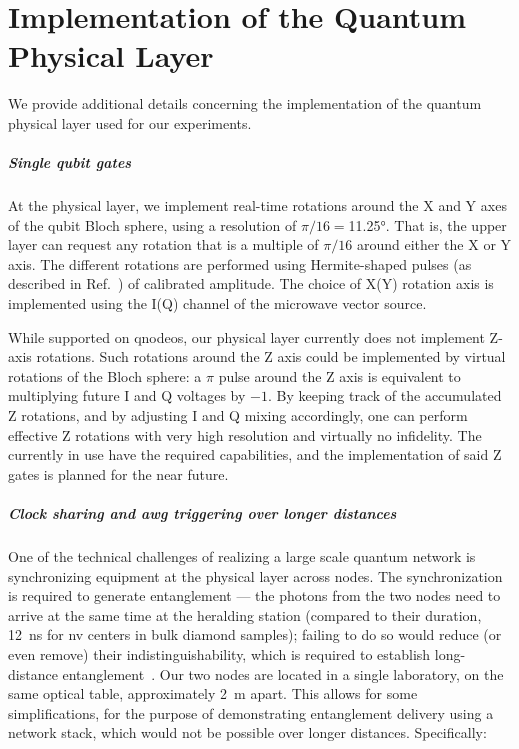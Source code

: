 \chapter{Implementation of the Quantum Physical Layer}
\label{app:phys}

We provide additional details concerning the implementation of the quantum physical layer used for
our experiments.

\paragraph{Single qubit gates}

At the physical layer, we implement real-time rotations around the X and Y axes of the qubit Bloch
sphere, using a resolution of $\pi/16=$\ang{11.25}. That is, the upper layer can request any
rotation that is a multiple of $\pi/16$ around either the X or Y axis. The different rotations are
performed using Hermite-shaped pulses (as described in Ref.~\cite{pompili_2021_multinode}) of
calibrated amplitude. The choice of X(Y) rotation axis is implemented using the I(Q) channel of the
microwave vector source.

While supported on \acrshort{qnodeos}, our physical layer currently does not implement Z-axis
rotations. Such rotations around the Z axis could be implemented by virtual rotations of the Bloch
sphere: a $\pi$ pulse around the Z axis is equivalent to multiplying future I and Q voltages by
$-1$. By keeping track of the accumulated Z rotations, and by adjusting I and Q mixing accordingly,
one can perform effective Z rotations with very high resolution and virtually no infidelity. The
 currently in use have the required capabilities, and the implementation of said Z
gates is planned for the near future.

\paragraph{Clock sharing and \acrshort{awg} triggering over longer distances}

One of the technical challenges of realizing a large scale quantum network is synchronizing
equipment at the physical layer across nodes. The synchronization is required to generate
entanglement --- the photons from the two nodes need to arrive at the same time at the heralding
station (compared to their duration, \qty{12}{\ns} for \acrshort{nv} centers in bulk diamond
samples); failing to do so would reduce (or even remove) their indistinguishability, which is
required to establish long-distance entanglement~\cite{pompili_2021_multinode}. Our two nodes are
located in a single laboratory, on the same optical table, approximately \qty{2}{\m} apart. This
allows for some simplifications, for the purpose of demonstrating entanglement delivery using a
network stack, which would not be possible over longer distances. Specifically:

